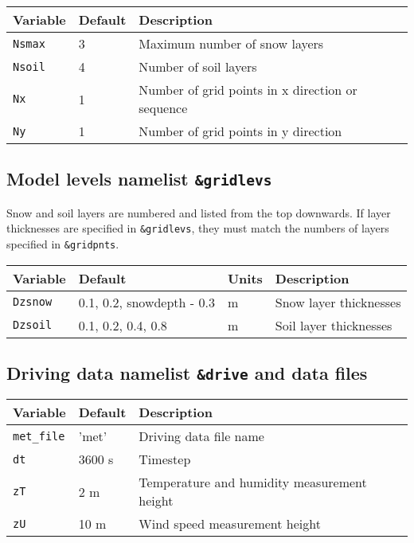 \documentclass{article}
\begin{document}
\begin{tabular}{|l|l|l|}
\hline
Variable & Default & Description \\
\hline
{\tt Nsmax} & 3 & Maximum number of snow layers \\
{\tt Nsoil} & 4 & Number of soil layers \\
{\tt Nx}    & 1 & Number of grid points in x direction or sequence \\
{\tt Ny}    & 1 & Number of grid points in y direction \\
\hline
\end{tabular}

\subsection*{Model levels namelist {\tt \&gridlevs}}
Snow and soil layers are numbered and listed from the top downwards. If layer thicknesses are specified in {\tt \&gridlevs}, they must match the numbers of layers specified in {\tt \&gridpnts}.

\begin{tabular}{|l|l|l|l|}
\hline
Variable & Default & Units & Description \\
\hline
{\tt Dzsnow} & 0.1, 0.2, snowdepth - 0.3 & m & Snow layer thicknesses \\
{\tt Dzsoil} & 0.1, 0.2, 0.4, 0.8        & m & Soil layer thicknesses \\
\hline
\end{tabular}

\subsection*{Driving data namelist {\tt \&drive} and data files}

\begin{tabular}{|l|l|l|}
\hline
Variable        & Default & Description                                 \\
\hline
{\tt met\_file} & 'met'   & Driving data file name                      \\
{\tt dt}        & 3600 s  & Timestep                                    \\
{\tt zT}        & 2 m     & Temperature and humidity measurement height \\
{\tt zU}        & 10 m    & Wind speed measurement height               \\
\hline 
\end{tabular}
\end{document}
